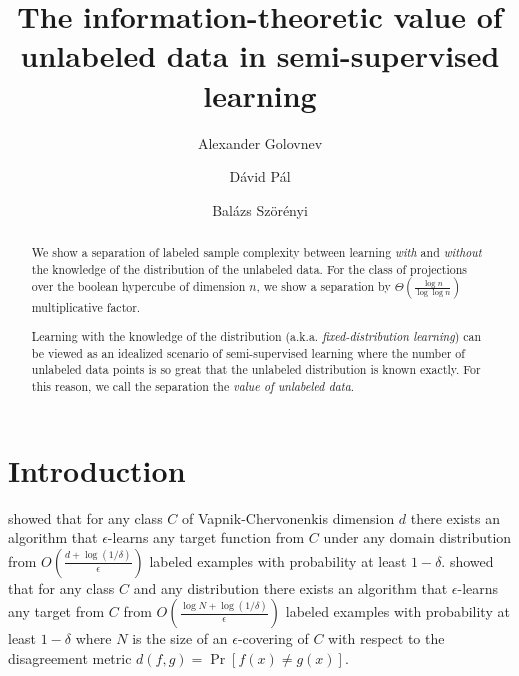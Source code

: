 \documentclass[10pt]{article}
\begin{document}
\title{The information-theoretic value of unlabeled data in semi-supervised learning}
\author{Alexander Golovnev \and D\'avid P\'al \and Bal\'azs Sz\"or\'enyi}

\maketitle

\begin{abstract}
We show a separation of labeled sample complexity between learning \emph{with}
and \emph{without} the knowledge of the distribution of the unlabeled data. For
the class of projections over the boolean hypercube of dimension $n$, we show a
separation by $\Theta(\frac{\log n}{\log \log n})$ multiplicative factor.

Learning with the knowledge of the distribution (a.k.a. \emph{fixed-distribution
learning}) can be viewed as an idealized scenario of semi-supervised learning
where the number of unlabeled data points is so great that the unlabeled
distribution is known exactly. For this reason, we call the separation
the \emph{value of unlabeled data}.
\end{abstract}


\section{Introduction}

\cite{Hanneke-2016} showed that for any class $C$ of Vapnik-Chervonenkis
dimension $d$ there exists an algorithm that $\epsilon$-learns any target
function from $C$ under any domain distribution  from $O\left(\frac{d +
\log(1/\delta)}{\epsilon}\right)$ labeled examples with probability at least
$1-\delta$. \cite{Benedek-Itai-1991} showed that for any class $C$ and any
distribution there exists an algorithm that $\epsilon$-learns any target from
$C$ from $O \left( \frac{\log N + \log (1/\delta)}{\epsilon}\right)$ labeled
examples with probability at least $1-\delta$ where $N$ is the size of an
$\epsilon$-covering of $C$ with respect to the disagreement metric $d(f,g) =
\Pr[f(x) \neq g(x)]$.
\end{document}

